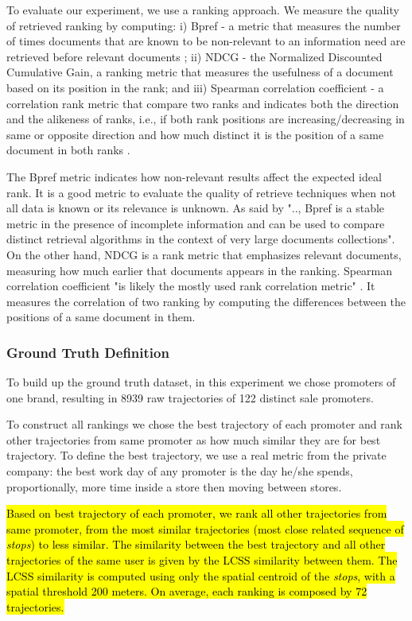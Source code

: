 \documentclass[12pt]{article}
\begin{document}
To evaluate our experiment, we use a ranking approach. We measure the quality of retrieved ranking by computing: i) Bpref - a metric that measures the number of times documents that are known to be non-relevant to an information need are retrieved before relevant documents \cite{BaezaYatesRibeiroNeto2011}; ii) NDCG - the Normalized Discounted Cumulative Gain, a ranking metric that measures the usefulness of a document based on its position in the rank\cite{BaezaYatesRibeiroNeto2011}; and iii) Spearman correlation coefficient - a correlation rank metric that compare two ranks and indicates both the direction and the alikeness of ranks, i.e., if both rank positions are increasing/decreasing in same or opposite direction and how much distinct it is the position of a same document in both ranks \cite{BaezaYatesRibeiroNeto2011}.

The Bpref metric indicates how non-relevant results affect the expected ideal rank. It is a good metric to evaluate the quality of retrieve techniques when not all data is known or its relevance is unknown. As said by \cite{BaezaYatesRibeiroNeto2011} ".., Bpref is a stable metric in the presence of incomplete information and can be used to compare distinct retrieval algorithms in the context of very large documents collections". On the other hand, NDCG is a rank metric that emphasizes relevant documents, measuring how much earlier that documents appears in the ranking. Spearman correlation coefficient "is likely the mostly used rank correlation metric" \cite{BaezaYatesRibeiroNeto2011}. It measures the correlation of two ranking by computing the differences between the positions of a same document in them.

\subsubsection{Ground Truth Definition}
To build up the ground truth dataset, in this experiment we chose promoters of one brand, resulting in 8939 raw trajectories of 122 distinct sale promoters.

To construct all rankings we chose the best trajectory of each promoter and rank other trajectories from same promoter as how much similar they are for best trajectory. To define the best trajectory, we use a real metric from the private company: the best work day of any promoter is the day he/she spends, proportionally, more time inside a store then moving between stores.

\hl{Based on best trajectory of each promoter, we rank all other trajectories from same promoter, from the most similar trajectories (most close related sequence of \emph{stops}) to less similar.
The similarity between the best trajectory and all other trajectories of the same user is given by the LCSS similarity between them. The LCSS similarity is computed using only the spatial centroid of the \emph{stops}, with a spatial threshold 200 meters. On average, each ranking is composed by 72 trajectories.}
\end{document}
